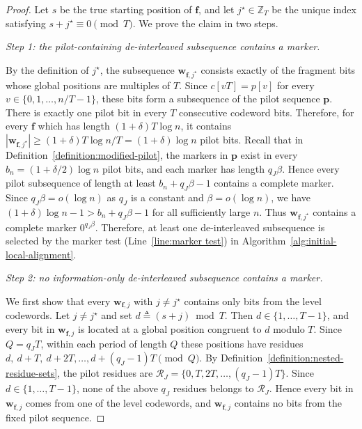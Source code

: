 \documentclass[journal,letterpaper,onecolumn,11pt]{IEEEtran}
\newcommand{\bZ}{\mathbb{Z}}
\newcommand{\cR}{\mathcal{R}}
\newcommand{\boldf}{\mathbf{f}}
\newcommand{\boldp}{\mathbf{p}}
\newcommand{\boldw}{\mathbf{w}}
\begin{document}
\begin{proof}
Let \(s\) be the true starting position of \(\boldf\), and let
\(j^\star\in\bZ_T\) be the unique index satisfying
\(s+j^\star\equiv0\pmod T\). We prove the claim in two steps.

\emph{Step 1: the pilot-containing de-interleaved subsequence contains a
marker.}

By the definition of \(j^\star\), the subsequence \(\boldw_{\boldf,j^\star}\) consists exactly of the fragment bits whose global positions are multiples of \(T\). 
Since \(c[vT]=p[v]\) for every \(v\in\{0,1,\ldots,n/T-1\}\), these bits form a subsequence of the pilot sequence \(\boldp\).
There is exactly one pilot bit in every \(T\) consecutive codeword
bits. 
Therefore, for every \(\boldf\) which has length
\((1+\delta)T\log n\), it contains
\(|\boldw_{\boldf,j^\star}|\geq(1+\delta)T\log n/T
=(1+\delta)\log n\) pilot bits.
Recall that in Definition~\ref{definition:modified-pilot}, the markers in \(\boldp\) exist in every \(b_n=(1+\delta/2)\log n\) pilot bits, and each marker has length \(q_J\beta\). 
Hence every pilot subsequence of length at least \(b_n+q_J\beta-1\) contains a complete marker. 
Since \(q_J\beta=o(\log n)\) as $q_J$ is a constant and $\beta=o(\log n)$, we have \((1+\delta)\log n-1>b_n+q_J\beta-1\) for all sufficiently large \(n\). 
Thus \(\boldw_{\boldf,j^\star}\) contains a complete marker \(0^{q_J\beta}\).
Therefore, at least one de-interleaved subsequence is selected by the marker
test (Line~\ref{line:marker test}) in Algorithm~\ref{alg:initial-local-alignment}.

\emph{Step 2: no information-only de-interleaved subsequence contains a
marker.}

We first show that every \(\boldw_{\boldf,j}\) with \(j\neq j^\star\)
contains only bits from the level codewords.  
Let \(j\neq j^\star\) and set \(d\triangleq(s+j)\bmod T\).  
Then \(d\in\{1,\ldots,T-1\}\), and every bit in \(\boldw_{\boldf,j}\) is located at a global position congruent to \(d\) modulo \(T\).  
Since \(Q=q_JT\), within each period of length \(Q\) these positions have residues $d,\ d+T,\ d+2T,\ldots,d+(q_J-1)T \pmod Q.$
By Definition~\ref{definition:nested-residue-sets}, the pilot residues are
$\cR_J=\{0,T,2T,\ldots,(q_J-1)T\}.$
Since \(d\in\{1,\ldots,T-1\}\), none of the above \(q_J\) residues belongs
to \(\cR_J\).  Hence every bit in \(\boldw_{\boldf,j}\) comes from one of
the level codewords, and \(\boldw_{\boldf,j}\) contains no bits from the
fixed pilot sequence.


\end{proof}
\end{document}
